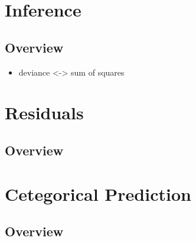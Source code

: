 \documentclass[11pt,fleqn]{book} %
\begin{document}

\chapter{Inference}

\section{Overview}

\begin{itemize}
	\item deviance <-> sum of squares
\end{itemize}



\chapter{Residuals}

\section{Overview}



\chapter{Cetegorical Prediction}

\section{Overview}

\end{document}
